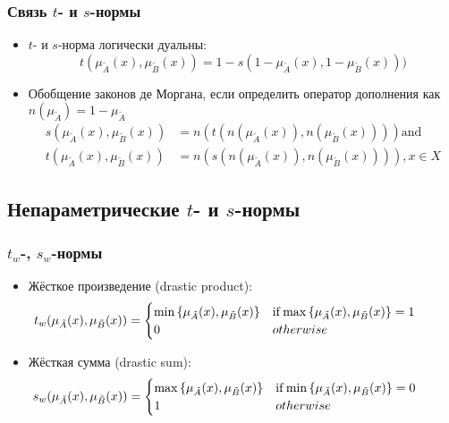 \documentclass{beamer}
\begin{document}
\begin{frame}\frametitle{Связь $t$- и $s$-нормы}
    
    \begin{itemize}
        \item $t$- и $s$-норма логически дуальны:
        \[
            t(\mu_{\tilde{A}}(x), \mu_{\tilde{B}}(x)) = 1 - s(1 - \mu_{\tilde{A}}(x), 1 - \mu_{\tilde{B}}(x)))
        \]
        \item Обобщение законов де Моргана, если определить оператор дополнения как $n(\mu_{\tilde{A}}) = 1 - \mu_{\tilde{A}}$
        \[
        \begin{align}
            s(\mu_{\tilde{A}}(x), \mu_{\tilde{B}}(x)) &= n(t(n(\mu_{\tilde{A}}(x)), n(\mu_{\tilde{B}}(x)))) \mathrm{and} \\
            t(\mu_{\tilde{A}}(x), \mu_{\tilde{B}}(x)) &= n(s(n(\mu_{\tilde{A}}(x)), n(\mu_{\tilde{B}}(x)))), x \in X
        \end{align}
        \]
    \end{itemize}

\end{frame}

\subsection{Непараметрические $t$- и $s$-нормы}

\begin{frame}\frametitle{$t_w$-, $s_w$-нормы}
    \begin{itemize}
        \item Жёсткое произведение (drastic product):
        \[ \hspace*{-1cm} 
            t_w(\mu_{\tilde{A}}(x), \mu_{\tilde{B}}(x)) = 
                \begin{cases}
                    \min{\left\{ \mu_{\tilde{A}}(x), \mu_{\tilde{B}}(x) \right\}} & \mathrm{if} \max{\left\{ \mu_{\tilde{A}}(x), \mu_{\tilde{B}}(x) \right\}} = 1 \\
                    0 & otherwise
                \end{cases}
        \]
        \item  Жёсткая сумма (drastic sum):
        \[ \hspace*{-1cm} 
            s_w(\mu_{\tilde{A}}(x), \mu_{\tilde{B}}(x)) = 
                \begin{cases}
                    \max{\left\{ \mu_{\tilde{A}}(x), \mu_{\tilde{B}}(x) \right\}} & \mathrm{if} \min{\left\{ \mu_{\tilde{A}}(x), \mu_{\tilde{B}}(x) \right\}} = 0 \\
                    1 & otherwise
                \end{cases}
        \]
    \end{itemize}
\end{frame}
\end{document}

